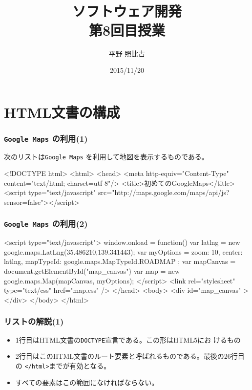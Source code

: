 \documentclass[dvipsk]{beamer}
\title{ソフトウェア開発\\第8回目授業}
\author{平野 照比古}
\institute{}
\date{2015/11/20}
\newcommand{\Elm}[1]{\texttt{<#1>}}
\begin{document}
\frame{\maketitle}
\section{HTML文書の構成}
\begin{frame}[containsverbatim]
\frametitle{\texttt{Google Maps} の利用(1)}
次のリストは\texttt{Google Maps} を利用して地図を表示するものである。
{\small
\begin{listing}[5]{1}
<!DOCTYPE html>
<html>
<head>
<meta http-equiv="Content-Type" 
   content="text/html; charset=utf-8"/>
<title>初めてのGoogleMaps</title>
<script type="text/javascript" 
  src="http://maps.google.com/maps/api/js?sensor=false"></script>
\end{listing}
}
\end{frame}
\begin{frame}[containsverbatim]
\frametitle{\texttt{Google Maps} の利用(2)}
{\small
\begin{listingcont}
<script type="text/javascript">
window.onload = function() {
  var latlng = new google.maps.LatLng(35.486210,139.341443);
  var myOptions = {
    zoom: 10,
    center: latlng,
    mapTypeId: google.maps.MapTypeId.ROADMAP
  };
  var mapCanvas = document.getElementById("map_canvas")
  var map = new google.maps.Map(mapCanvas, myOptions);
}
</script>
<link rel="stylesheet" type="text/css" href="map.css" /> 
</head>
<body>
  <div id="map_canvas" ></div>
</body>
</html> 
\end{listingcont}
}
\end{frame}
\begin{frame}[containsverbatim]
 \frametitle{リストの解説(1)}
\begin{itemize}
 \item 1行目はHTML文書の\texttt{DOCTYPE}宣言である。この形はHTML5にお
       けるもの
 \item 2行目はこのHTML文書のルート要素と呼ばれるものである。最後の26行目
       の \Elm{/html}までが有効となる。
 \item すべての要素はこの範囲になければならない。
\end{itemize}
\end{frame}
\end{document}
